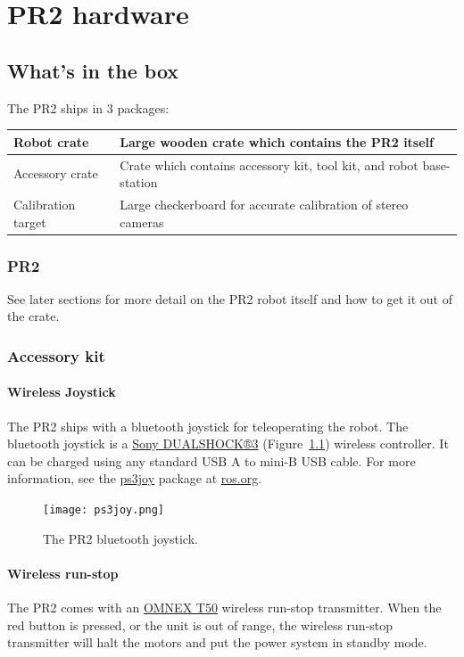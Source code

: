 \chapter{PR2 hardware}

\section{What's in the box}
The PR2 ships in 3 packages:

\begin{tabular}{| l | l |}
\hline      
  Robot crate & Large wooden crate which contains the PR2 itself \\ \hline
  Accessory crate & Crate which contains accessory kit, tool kit, and robot base-station \\ \hline
  Calibration target & Large checkerboard for accurate calibration of stereo cameras \\ \hline
\end{tabular}

\subsection{PR2}
See later sections for more detail on the PR2 robot itself and how to get it out of the crate.
\subsection{Accessory kit}
\subsubsection{Wireless Joystick}
The PR2 ships with a bluetooth joystick for teleoperating the robot. The bluetooth joystick is a 
\href{http://www.sonystyle.com/webapp/wcs/stores/servlet/ProductDisplay?catalogId=10551&storeId=10151&langId=-1&productId=8198552921665411965#additionalImage1%22}{Sony DUALSHOCK®3} (Figure~\ref{fig:ps3joy}) 
wireless controller. It can be charged using any standard USB A to mini-B USB cable. For more information, see the 
\href{http://www.ros.org/wiki/ps3joy}{ps3joy} package at \href{http://www.ros.org}{ros.org}.

\begin{figure}[h]
\centering
\texttt{[image: ps3joy.png]}
\caption{The PR2 bluetooth joystick.}
\label{fig:ps3joy}
\end{figure}

\subsubsection{Wireless run-stop}
\label{wirelessrunstop}
The PR2 comes with an \href{http://www.omnexcontrols.com/products/portable/t50.html}{OMNEX T50} 
wireless run-stop transmitter. When the red button is pressed, or the unit is out of range, the wireless run-stop transmitter will halt the motors 
and put the power system in standby mode. 

